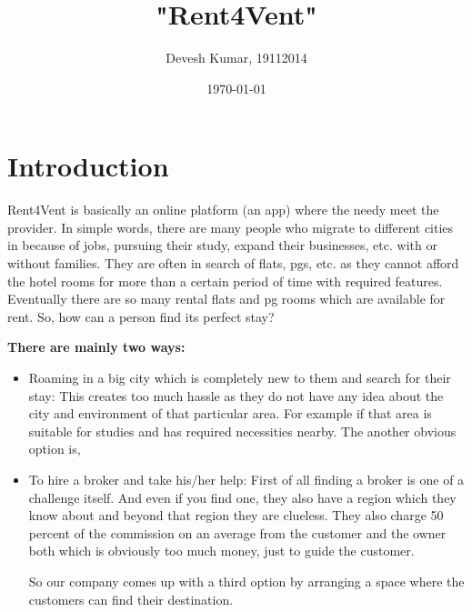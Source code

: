 \documentclass{article}
\title{\textbf{"Rent4Vent"}}
\author{Devesh Kumar, 19112014}
\date{\today}
\begin{document}
\maketitle

\section{Introduction}

\setlength{\parskip}{1em}

\large Rent4Vent is basically an online platform (an app) where the needy meet the provider. In simple words, there are many people who migrate to different cities in because of jobs, pursuing their study, expand their businesses, etc. with or without families. They are often in search of flats, pgs, etc. as they cannot afford the hotel rooms for more than a certain period of time with required features. Eventually there are so many rental flats and pg rooms which are available for rent. So, how can a person find its perfect stay? 

\setlength{\parskip}{1em}




\large{\textbf{There are mainly two ways:  }}
\begin{itemize}
    \item 	Roaming in a big city which is completely new to them and search for their stay: This creates too much hassle as they do not have any idea about the city and environment of that particular area. For example if that area is suitable for studies and has required necessities nearby. The another obvious option is,
    \item	To hire a broker and take his/her help: First of all finding a broker is one of a challenge itself. And even if you find one, they also have a region which they know about and beyond that region they are clueless. They also charge 50 percent of the commission on an average from the customer and the owner both which is obviously too much money, just to guide the customer.
    
\setlength{\parskip}{1em}

\large So our company comes up with a third option by arranging a space where the customers can find their destination. 
    
\end{itemize}
\end{document}
